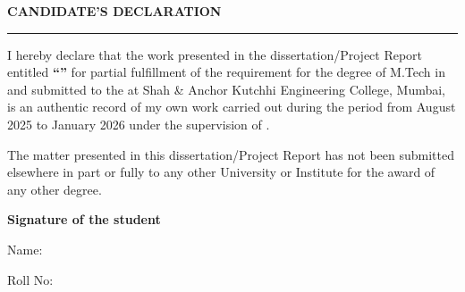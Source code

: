 \thispagestyle{empty}

\begin{center}
{\Large {\bf \uppercase{Candidate's Declaration}}}
\end{center}

\vspace{\baselineskip}
\hrule
\vspace{2\baselineskip}

\justifying
\setlength{\parskip}{0.6em}

I hereby declare that the work presented in the dissertation/Project Report entitled {\textbf{{``\mytitle''}}} for partial fulfillment of the requirement for the degree of M.Tech in \branch{} and submitted to the \mydep{} at Shah \& Anchor Kutchhi Engineering College, Mumbai, is an authentic record of my own work carried out during the period from August 2025 to January 2026 under the supervision of {\textbf{\mysupervisor}}.\par
\vspace{2\baselineskip}
The matter presented in this dissertation/Project Report has not been submitted elsewhere in part or fully to any other University or
Institute for the award of any other degree.


\bigskip


\bigskip


\bigskip

{\textbf{Signature of the student \ \ \ \ \ \ }}

{Name: \myname} \par

{Roll No: \myrollno}